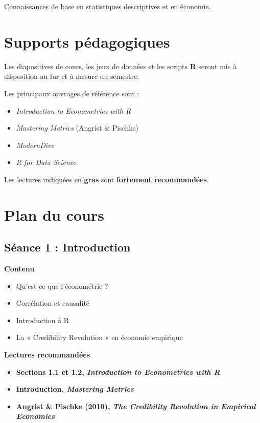 \documentclass[
  11pt,
]{article}
\providecommand{\tightlist}{%
  \setlength{\itemsep}{0pt}\setlength{\parskip}{0pt}}
\begin{document}
Connaissances de base en statistiques descriptives et en économie.

\section{Supports pédagogiques}\label{supports-puxe9dagogiques}

Les diapositives de cours, les jeux de données et les scripts \textbf{R}
seront mis à disposition au fur et à mesure du semestre.

Les principaux ouvrages de référence sont :

\begin{itemize}
\tightlist
\item
  \emph{Introduction to Econometrics with R}
\item
  \emph{Mastering Metrics} (Angrist \& Pischke)
\item
  \emph{ModernDive}
\item
  \emph{R for Data Science}
\end{itemize}

Les lectures indiquées en \textbf{gras} sont \textbf{fortement
recommandées}.

\section{Plan du cours}\label{plan-du-cours}

\subsection{Séance 1 : Introduction}\label{suxe9ance-1-introduction}

\textbf{Contenu}

\begin{itemize}
\tightlist
\item
  Qu'est-ce que l'économétrie ?
\item
  Corrélation et causalité
\item
  Introduction à R
\item
  La « Credibility Revolution » en économie empirique
\end{itemize}

\textbf{Lectures recommandées}

\begin{itemize}
\tightlist
\item
  \textbf{Sections 1.1 et 1.2, \emph{Introduction to Econometrics with
  R}}
\item
  \textbf{Introduction, \emph{Mastering Metrics}}
\item
  \textbf{Angrist \& Pischke (2010), \emph{The Credibility Revolution in
  Empirical Economics}}
\end{itemize}
\end{document}
